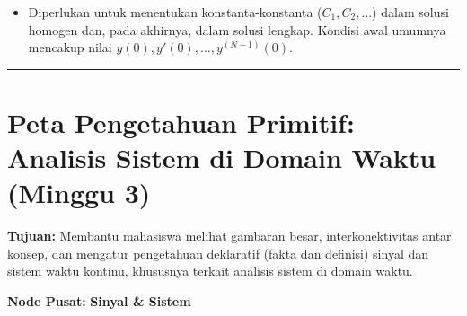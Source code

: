 \documentclass[
  letterpaper,
  DIV=11,
  numbers=noendperiod]{scrreprt}
\providecommand{\tightlist}{%
  \setlength{\itemsep}{0pt}\setlength{\parskip}{0pt}}
\begin{document}
\begin{itemize}
  \begin{itemize}
  \tightlist
  \item
    Diperlukan untuk menentukan konstanta-konstanta
    (\(C_1, C_2, \dots\)) dalam solusi homogen dan, pada akhirnya, dalam
    solusi lengkap. Kondisi awal umumnya mencakup nilai
    \(y(0), y'(0), \dots, y^{(N-1)}(0)\).
  \end{itemize}
\end{itemize}

\begin{center}\rule{0.5\linewidth}{0.5pt}\end{center}


\chapter{Peta Pengetahuan Primitif: Analisis Sistem di Domain Waktu
(Minggu
3)}\label{peta-pengetahuan-primitif-analisis-sistem-di-domain-waktu-minggu-3}

\textbf{Tujuan:} Membantu mahasiswa melihat gambaran besar,
interkonektivitas antar konsep, dan mengatur pengetahuan deklaratif
(fakta dan definisi) sinyal dan sistem waktu kontinu, khususnya terkait
analisis sistem di domain waktu.

\textbf{Node Pusat:} \textbf{Sinyal \& Sistem}
\end{document}
